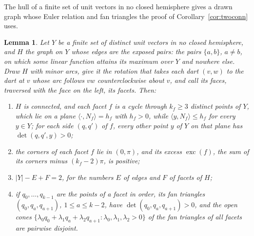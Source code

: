 \documentclass[12pt]{amsart}
\newtheorem{lemma}[theorem]{Lemma}
\theoremstyle{definition}
\theoremstyle{plain}
\theoremstyle{definition}
\newcommand{\leanmap}[1]{\ignorespaces}
\begin{document}
The hull of a finite set of unit vectors in no closed hemisphere gives a drawn graph whose Euler relation and fan triangles the proof of Corollary~\ref{cor:twoconn} uses.

\begin{lemma}\label{lem:hull}\leanmap{Tammes15.hullGraph, Tammes15.ExposedPair, Tammes15.exists_angular, Tammes15.hull_step, Tammes15.facetPolar, Tammes15.isFacetPolar_facetPolar, Tammes15.facetPolar_strict, Tammes15.facet_fst_injective, Tammes15.facet_period_ge_three, Tammes15.facet_excess, Tammes15.hull_corner_total, Tammes15.hull_connected, Tammes15.hull_euler, Tammes15.fan_det_pos, Tammes15.cone_unique}
Let $Y$ be a finite set of distinct unit vectors in no closed hemisphere, and $H$ the graph on $Y$ whose edges are the \emph{exposed pairs}: the pairs $\{a,b\}$, $a\ne b$, on which some linear function attains its maximum over $Y$ and nowhere else. Draw $H$ with minor arcs, give it the rotation that takes each dart $(v,w)$ to the dart at $v$ whose arc follows $vw$ counterclockwise about $v$, and call its faces, traversed with the face on the left, its \emph{facets}. Then:
\begin{enumerate}
\item $H$ is connected, and each facet $f$ is a cycle through $k_f\ge3$ distinct points of $Y$, which lie on a plane $\langle\cdot,N_f\rangle=h_f$ with $h_f>0$, while $\langle y,N_f\rangle\le h_f$ for every $y\in Y$; for each side $(q,q')$ of $f$, every other point $y$ of $Y$ on that plane has $\det(q,q',y)>0$;
\item the corners of each facet $f$ lie in $(0,\pi)$, and its \emph{excess} $\operatorname{exc}(f)$, the sum of its corners minus $(k_f-2)\pi$, is positive;
\item $|Y|-E+F=2$, for the numbers $E$ of edges and $F$ of facets of $H$;
\item if $q_0,\dots,q_{k-1}$ are the points of a facet in order, its \emph{fan triangles} $(q_0,q_a,q_{a+1})$, $1\le a\le k-2$, have $\det(q_0,q_a,q_{a+1})>0$, and the open cones $\{\lambda_0q_0+\lambda_1q_a+\lambda_2q_{a+1}:\lambda_0,\lambda_1,\lambda_2>0\}$ of the fan triangles of all facets are pairwise disjoint.
\end{enumerate}
\end{lemma}
\end{document}
